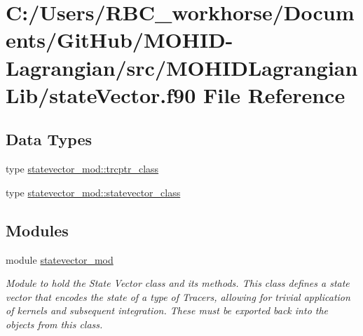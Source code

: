 \hypertarget{state_vector_8f90}{}\section{C\+:/\+Users/\+R\+B\+C\+\_\+workhorse/\+Documents/\+Git\+Hub/\+M\+O\+H\+I\+D-\/\+Lagrangian/src/\+M\+O\+H\+I\+D\+Lagrangian\+Lib/state\+Vector.f90 File Reference}
\label{state_vector_8f90}
\subsection*{Data Types}
\begin{DoxyCompactItemize}
\item 
type \mbox{\hyperlink{structstatevector__mod_1_1trcptr__class}{statevector\+\_\+mod\+::trcptr\+\_\+class}}
\item 
type \mbox{\hyperlink{structstatevector__mod_1_1statevector__class}{statevector\+\_\+mod\+::statevector\+\_\+class}}
\end{DoxyCompactItemize}
\subsection*{Modules}
\begin{DoxyCompactItemize}
\item 
module \mbox{\hyperlink{namespacestatevector__mod}{statevector\+\_\+mod}}
\begin{DoxyCompactList}\small\item\em Module to hold the State Vector class and its methods. This class defines a state vector that encodes the state of a type of Tracers, allowing for trivial application of kernels and subsequent integration. These must be exported back into the objects from this class. \end{DoxyCompactList}\end{DoxyCompactItemize}
